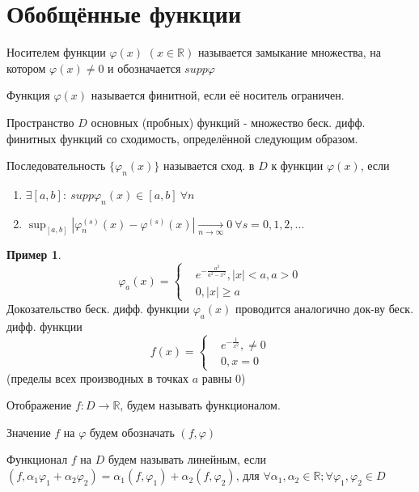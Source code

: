 \documentclass{article}
\theoremstyle{definition}
\numberwithin{theorem}{section}
\numberwithin{lemma}{section}
\numberwithin{definition}{section}
\numberwithin{corollary}{section}
\newtheorem*{eg}{Пример}
\numberwithin{equation}{section}
\let\phi\varphi
\newcommand\R{\ensuremath{\mathbb{R}}}
\begin{document}
\section{Обобщённые функции}
\begin{definition}
  Носителем функции $\phi(x)$ $(x\in \R)$ называется замыкание множества,
  на котором $\phi(x) \neq 0$ и обозначается $supp \phi$
\end{definition}
\begin{definition}
  Функция $\phi(x)$ называется финитной, если её носитель ограничен.
\end{definition}
\begin{definition}
  Пространство $D$ основных (пробных) функций - множество беск. дифф. финитных функций
  со сходимость, определённой следующим образом.
\end{definition}
\begin{definition}
  Последовательность $\{\phi_n(x)\}$ называется сход. в $D$ к функции $\phi(x)$, если 
  \begin{enumerate}
    \item $\exists [a,b]: \ supp \phi_n(x) \in [a,b] \ \forall n$
    \item $\sup_{[a,b]}|\phi_n^{(s)}(x)-\phi^{(s)}(x)| \underset{n\to \infty}{\to} 0 \ \forall s =0,1,2,\dots $
  \end{enumerate}
\end{definition}
\begin{eg}
  \[
    \phi_a(x)=\left\{\begin{aligned}
      &e^{-\frac{a^{2}}{a^{2}-x^{2}}}, |x|<a, a>0 \\ 
      &0, |x|\ge a
    \end{aligned}\right.
  \]
  Докозательство беск. дифф. функции $\phi_a(x)$ проводится аналогично док-ву беск. дифф. функции
  \[
    f(x) = \left\{\begin{aligned}
      & e^{-\frac{1}{x^{2}}}, \neq 0 \\ 
      & 0, x=0
    \end{aligned}\right.
  \]
  (пределы всех производных в точках $a$ равны $0$)
\end{eg}
\begin{definition}
  Отображение $f: D \to \R$, будем называть функционалом.

  Значение $f$ на $\phi$ будем обозначать $(f,\phi)$
\end{definition}
\begin{definition}
  Функционал $f$ на $D$ будем называть линейным, если $(f,\alpha_1\phi_1+\alpha_2\phi_2)=\alpha_1(f,\phi_1)+\alpha_2(f,\phi_2)$,
  для $\forall \alpha_1,\alpha_2 \in \R; \forall \phi_1,\phi_2 \in D$
\end{definition}
\end{document}
